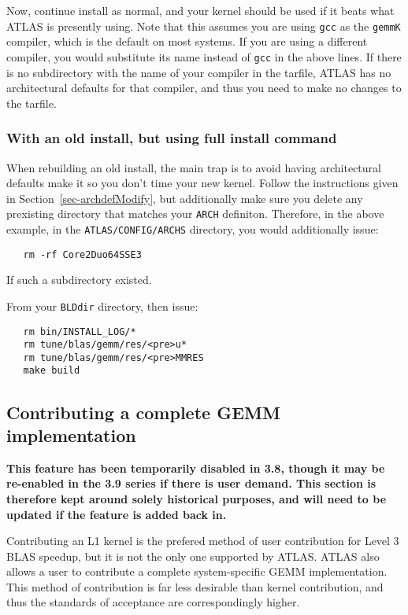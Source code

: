 \documentclass[11pt]{article}
\begin{document}
Now, continue install as normal, and your kernel should be used if it beats
what ATLAS is presently using.  Note that this assumes you are using {\tt gcc}
as the {\tt gemmK} compiler, which is the default on most systems.  If
you are using a different compiler, you would substitute its name instead
of {\tt gcc} in the above lines.  If there is no subdirectory with the
name of your compiler in the tarfile, ATLAS has no architectural defaults
for that compiler, and thus you need to make no changes to the tarfile.

\subsubsection{With an old install, but using full install command}
When rebuilding an old install, the main trap is to avoid having
architectural defaults make it so you don't time your new kernel.
Follow the instructions given in Section~\ref{sec-archdefModify},
but additionally make sure you delete any prexisting directory
that matches your {\tt ARCH} definiton.  Therefore, in the above
example, in the {\tt ATLAS/CONFIG/ARCHS} directory, you would
additionally issue:
\begin{verbatim}
   rm -rf Core2Duo64SSE3
\end{verbatim}
If such a subdirectory existed.

From your {\tt BLDdir} directory, then issue:
\begin{verbatim}
   rm bin/INSTALL_LOG/*
   rm tune/blas/gemm/res/<pre>u*
   rm tune/blas/gemm/res/<pre>MMRES
   make build
\end{verbatim}

\subsection{Contributing a complete GEMM implementation}
\textbf{
This feature has been temporarily disabled in 3.8, though it may be
re-enabled in the 3.9 series if there is user demand.  This section
is therefore kept around solely historical purposes, and will need
to be updated if the feature is added back in.
}

Contributing an L1 kernel is the prefered method of user contribution
for Level 3 BLAS speedup, but it is not the only one supported by ATLAS.
ATLAS also allows a user to contribute a complete system-specific
GEMM implementation.  This method of contribution is far less desirable
than kernel contribution, and thus the standards of acceptance are
correspondingly higher.
\end{document}
